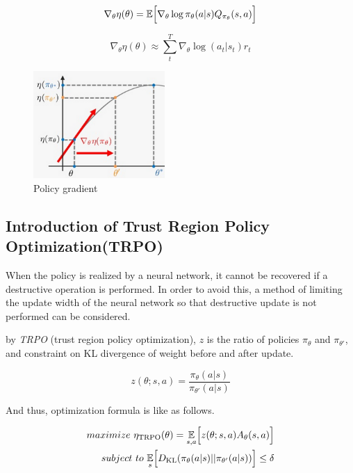 \[
\nabla_\theta \eta(\theta)=\mathbb{E}\Bigl[ \nabla_\theta \log \pi_\theta(a|s) Q_{\pi_\theta}(s,a)   \Bigr]
\]

\[
\nabla_\theta \eta(\theta) \approx \sum_{t}^{T} \nabla_\theta \log (a_t|s_t)r_t
\]



\begin{figure}[H]
\begin{center}
\includegraphics[width=5cm]{./figures/example_policy_gradient.png}
\caption{Policy gradient}
\label{fig:example_policy_gradient}
\end{center}
\end{figure}


\subsection{Introduction of Trust Region Policy Optimization(TRPO)}

When the policy is realized by a neural network, it cannot be recovered if a destructive operation is performed.
In order to avoid this, a method of limiting the update width of the neural network so that destructive update is not performed can be considered.

by {\it TRPO} (trust region policy optimization), $z$ is the ratio of policies $\pi_\theta$ and $\pi_{\theta'}$, and constraint on KL divergence of weight before and after update.

\[
z(\theta;s,a) = \frac{\pi_{\theta}(a|s)}{\pi_{\theta'}(a|s)}
\]

And thus, optimization formula is like as follows.

\begin{eqnarray*}
maximize ~\eta_{\mathrm{TRPO}}(\theta) = \underset{s,a}{\mathbb{E}}\Bigl[  z(\theta;s,a)A_{\theta}(s,a) \Bigr] \\
subject ~to~  \underset{s}{\mathbb{E}}\Bigl[ D_{\mathrm{KL}}(\pi_{\theta}(a|s)||\pi_{\theta'}(a|s)) \Bigr]  \leq \delta
\end{eqnarray*}


